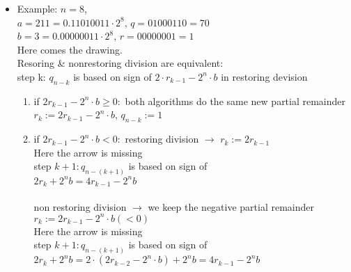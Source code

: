 \begin{itemize}
\item Example: $n=8$, \\
$a=211=0.11010011\cdot 2^8$, $q=01000110=70$ \\
$b=3=0.00000011\cdot 2^8$, $r=00000001=1$ \\

Here comes the drawing. \\
Resoring & nonrestoring division are equivalent: \\
step k: $q_{n-k}$ is based on sign of $2\cdot r_{k-1}-2^n\cdot b$ in restoring devision
\begin{enumerate}
    \item if $2r_{k-1}-2^n\cdot b \ge 0:$ both algorithms do the same new partial remainder $r_k:=2r_{k-1}-2^n\cdot b$, $q_{n-k}:=1$
    \item if $2r_{k-1}-2^n\cdot b < 0:$ restoring division $\to$  $r_k:=2r_{k-1}$ \\
    Here the arrow is missing \\
    step $k+1: q_{n-(k+1)}$ is based on sign of \\
    $2r_k+2^nb=4r_{k-1}-2^nb$ \\
    \\
    non restoring division $\to$ we keep the negative partial remainder $r_k:=2r_{k-1}-2^n\cdot b (<0)$ \\
    Here the arrow is missing  \\
    step $k+1: q_{n-(k+1)}$ is based on sign of \\
    $2r_k+2^nb=2\cdot (2r_{k-2}-2^n\cdot b) + 2^nb=4r_{k-1}-2^nb$ \\
   

\end{enumerate}
\end{itemize}
